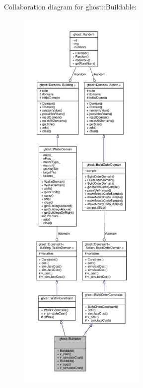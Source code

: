 Collaboration diagram for ghost\-:\-:Buildable\-:
\nopagebreak
\begin{figure}[H]
\begin{center}
\leavevmode
\includegraphics[height=550pt]{classghost_1_1Buildable__coll__graph}
\end{center}
\end{figure}
